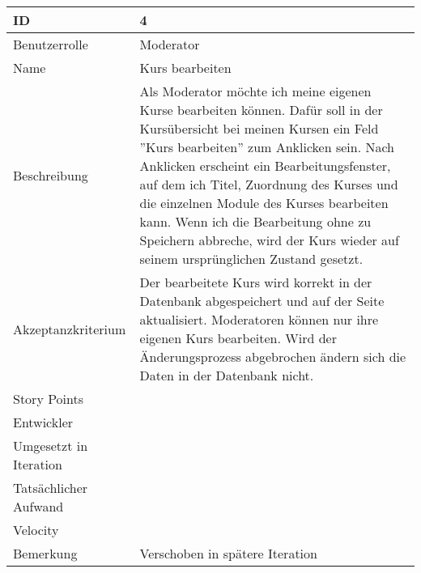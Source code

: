 \begin{tabularx}{\textwidth}{|p{}|X|}
	\hline
	ID & 4\\
	\hline
	Benutzerrolle & Moderator\\
	\hline
	Name & Kurs bearbeiten\\
	\hline
	Beschreibung & Als Moderator möchte ich meine eigenen Kurse bearbeiten können. Dafür soll in der Kursübersicht bei meinen Kursen ein Feld ''Kurs bearbeiten'' zum Anklicken sein. Nach Anklicken erscheint ein Bearbeitungsfenster, auf dem ich Titel, Zuordnung des Kurses und die einzelnen Module des Kurses bearbeiten kann. Wenn ich die Bearbeitung ohne zu Speichern abbreche, wird der Kurs wieder auf seinem ursprünglichen Zustand gesetzt.\\
	\hline
	Akzeptanzkriterium & Der bearbeitete Kurs wird korrekt in der Datenbank abgespeichert und auf der Seite aktualisiert. Moderatoren können nur ihre eigenen Kurs bearbeiten. Wird der Änderungsprozess abgebrochen ändern sich die Daten in der Datenbank nicht.\\
	\hline
	Story Points & \\
	\hline
	Entwickler & \\
	\hline
	Umgesetzt in Iteration & \\
	\hline
	Tatsächlicher Aufwand & \\
	\hline
	Velocity & \\
	\hline
	Bemerkung & Verschoben in spätere Iteration\\
	\hline
\end{tabularx}
\vspace{20pt}
